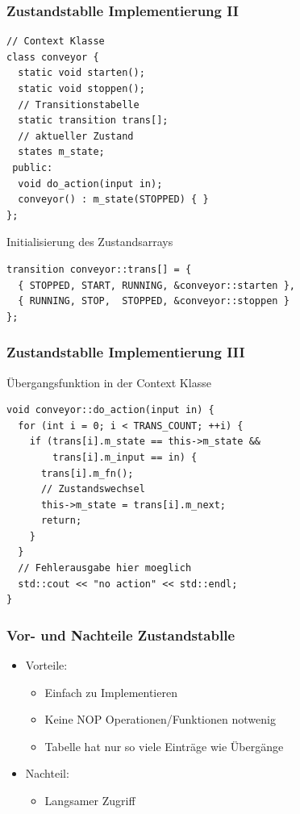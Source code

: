\documentclass{beamer}
\begin{document}
\begin{frame}[fragile]
 \frametitle{Zustandstablle Implementierung II}
 \begin{lstlisting}
// Context Klasse
class conveyor {
  static void starten();
  static void stoppen();
  // Transitionstabelle
  static transition trans[];
  // aktueller Zustand
  states m_state;
 public:
  void do_action(input in);
  conveyor() : m_state(STOPPED) { }
};
 \end{lstlisting}
 Initialisierung des Zustandsarrays
 \begin{lstlisting}
transition conveyor::trans[] = {
  { STOPPED, START, RUNNING, &conveyor::starten },
  { RUNNING, STOP,  STOPPED, &conveyor::stoppen }
};
 \end{lstlisting}
\end{frame}

\begin{frame}[fragile]
 \frametitle{Zustandstablle Implementierung III}
 \"Ubergangsfunktion in der Context Klasse
 \begin{lstlisting}
void conveyor::do_action(input in) {
  for (int i = 0; i < TRANS_COUNT; ++i) {
    if (trans[i].m_state == this->m_state &&
        trans[i].m_input == in) {
      trans[i].m_fn();
      // Zustandswechsel
      this->m_state = trans[i].m_next;
      return;
    }
  }
  // Fehlerausgabe hier moeglich
  std::cout << "no action" << std::endl;
}
 \end{lstlisting}
\end{frame}

\begin{frame}
 \frametitle{Vor- und Nachteile Zustandstablle}
 \begin{itemize}
  \item Vorteile:
  \begin{itemize}
   \item Einfach zu Implementieren
   \item Keine NOP Operationen/Funktionen notwenig
   \item Tabelle hat nur so viele Eintr\"age wie \"Uberg\"ange
  \end{itemize}
  \item Nachteil:
  \begin{itemize}
   \item Langsamer Zugriff
  \end{itemize}
 \end{itemize}
\end{frame}
\end{document}
